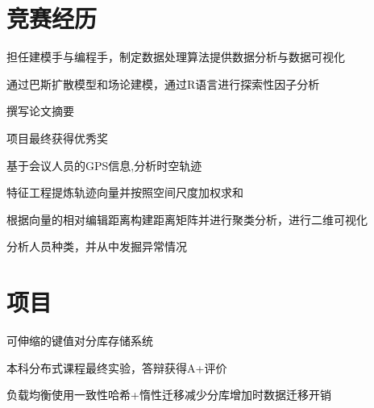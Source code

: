 \documentclass[]{deedy-resume-openfont}
\begin{document}
\hfill
\begin{minipage}[t]{0.73\textwidth} 


\section{竞赛经历}
\sectionsep
{}
\vspace{\topsep}
\begin{tightemize}
    \item 担任建模手与编程手，制定数据处理算法提供数据分析与数据可视化
    \item 通过巴斯扩散模型和场论建模，通过R语言进行探索性因子分析
    \item 撰写论文摘要

\end{tightemize}
\sectionsep
{}
\begin{tightemize}
\item 项目最终获得优秀奖
\item 基于会议人员的GPS信息,分析时空轨迹
\item 特征工程提炼轨迹向量并按照空间尺度加权求和
\item 根据向量的相对编辑距离构建距离矩阵并进行聚类分析，进行二维可视化
\item 分析人员种类，并从中发掘异常情况
\end{tightemize}
\sectionsep


\section{项目}
\sectionsep


\begin{tightemize}
    \item 可伸缩的键值对分库存储系统
    \item 本科分布式课程最终实验，答辩获得A+评价
    \item 负载均衡使用一致性哈希+惰性迁移减少分库增加时数据迁移开销
    \end{tightemize}
\sectionsep


\end{minipage}
\end{document}
